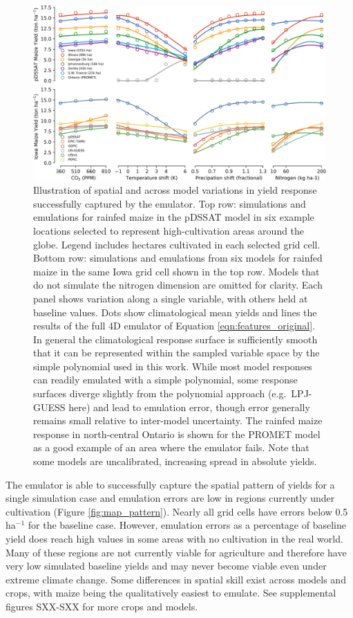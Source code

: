 \documentclass[gmd, manuscript]{copernicus} %
\begin{document}
\begin{figure}[ht]
\centering
    \includegraphics[width=16cm]{figures/regression_example.png}
    \caption{Illustration of spatial and across model variations in yield response successfully captured by the emulator. 
    Top row: simulations and emulations for rainfed maize in the pDSSAT model in six example locations selected to represent high-cultivation areas around the globe. 
    Legend includes hectares cultivated in each selected grid cell. 
    Bottom row: simulations and emulations from six models for rainfed maize in the same Iowa grid cell shown in the top row. 
    Models that do not simulate the nitrogen dimension are omitted for clarity.
    Each panel shows variation along a single variable, with others held at baseline values. 
    Dots show climatological mean yields and lines the results of the full 4D emulator of Equation \ref{eqn:features_original}. 
    In general the climatological response surface is sufficiently smooth that it can be represented within the sampled variable space by the simple polynomial used in this work. 
    While most model responses can readily emulated with a simple polynomial, some response surfaces diverge slightly from the polynomial approach (e.g.\ LPJ-GUESS here) and lead to emulation error, though error generally remains small relative to inter-model uncertainty. 
    The rainfed maize response in north-central Ontario is shown for the PROMET model as a good example of an area where the emulator fails.
    Note that some models are uncalibrated, increasing spread in absolute yields. 
    }
   \label{fig:regression}
\end{figure}

The emulator is able to successfully capture the spatial pattern of yields for a single simulation case and emulation errors are low in regions currently under cultivation (Figure \ref{fig:map_pattern}). 
Nearly all grid cells have errors below 0.5 ha$^{-1}$ for the baseline case. 
However, emulation errors as a percentage of baseline yield does reach high values in some areas with no cultivation in the real world.
Many of these regions are not currently viable for agriculture and therefore have very low simulated baseline yields and may never become viable even under extreme climate change.  
Some differences in spatial skill exist across models and crops, with maize being the qualitatively easiest to emulate. 
See supplemental figures SXX-SXX for more crops and models. 
\end{document}
